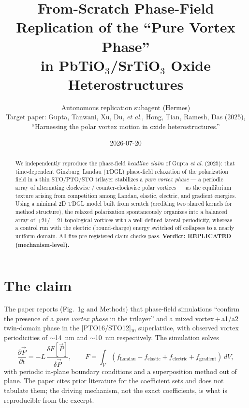 \documentclass[11pt]{article}
\title{From-Scratch Phase-Field Replication of the ``Pure Vortex Phase''\\
in PbTiO$_3$/SrTiO$_3$ Oxide Heterostructures}
\author{Autonomous replication subagent (Hermes)\\
\small Target paper: Gupta, Tanwani, Xu, Du, \emph{et al.}, Hong, Tian, Ramesh, Das (2025),\\
\small ``Harnessing the polar vortex motion in oxide heterostructures.''}
\date{2026-07-20}
\begin{document}
\maketitle

\begin{abstract}
We independently reproduce the phase-field \emph{headline claim} of Gupta
\emph{et al.} (2025): that time-dependent Ginzburg--Landau (TDGL) phase-field
relaxation of the polarization field in a thin STO/PTO/STO trilayer stabilizes
a \emph{pure vortex phase} --- a periodic array of alternating clockwise /
counter-clockwise polar vortices --- as the equilibrium texture arising from
competition among Landau, elastic, electric, and gradient energies. Using a
minimal 2D TDGL model built from scratch (crediting two shared kernels for
method structure), the relaxed polarization spontaneously organizes into a
balanced array of $+21/-21$ topological vortices with a well-defined lateral
periodicity, whereas a control run with the electric (bound-charge) energy
switched off collapses to a nearly uniform domain. All five pre-registered
claim checks pass. \textbf{Verdict: REPLICATED (mechanism-level).}
\end{abstract}

\section{The claim}
The paper reports (Fig.~1g and Methods) that phase-field simulations
``confirm the presence of a \emph{pure vortex phase} in the trilayer'' and a
mixed vortex\,$+$\,a1/a2 twin-domain phase in the [PTO16/STO12]$_{10}$
superlattice, with observed vortex periodicities of $\sim$14~nm and
$\sim$10~nm respectively. The simulation solves
\begin{equation}
\frac{\partial \vec P}{\partial t} = -L\,\frac{\delta F[\vec P]}{\delta \vec P},
\qquad
F = \int_V \left(f_{\text{Landau}} + f_{\text{elastic}} + f_{\text{electric}}
+ f_{\text{gradient}}\right)\,dV,
\end{equation}
with periodic in-plane boundary conditions and a superposition method out of
plane. The paper cites prior literature for the coefficient sets and does not
tabulate them; the driving mechanism, not the exact coefficients, is what is
reproducible from the excerpt.
\end{document}
